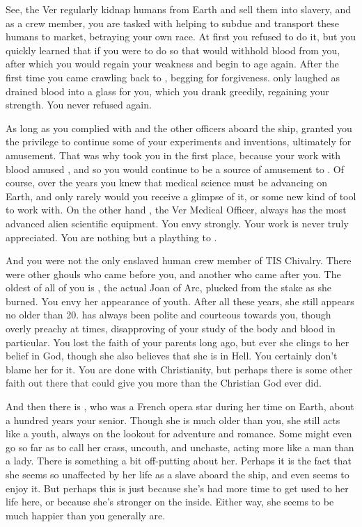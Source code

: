 \documentclass[char]{guildcamp4}
\begin{document}
See, the Ver regularly kidnap humans from Earth and sell them into slavery, and as a crew member, you are tasked with helping to subdue and transport these humans to market, betraying your own race. At first you refused to do it, but you quickly learned that if you were to do so that \cVone{} would withhold \cVone{\their} blood from you, after which you would regain your weakness and begin to age again. After the first time you came crawling back to \cVone{}, begging for forgiveness. \cVone{} only laughed as \cVone{\they} drained \cVone{\their} blood into a glass for you, which you drank greedily, regaining your strength. You never refused again.

As long as you complied with \cVone{} and the other officers aboard the ship, \cVone{} granted you the privilege to continue some of your experiments and inventions, ultimately for \cVone{\their} amusement. That was why \cVone{\they} took you in the first place, because your work with blood amused \cVone{\them}, and so you would continue to be a source of amusement to \cVone{\them}. Of course, over the years you knew that medical science must be advancing on Earth, and only rarely would you receive a glimpse of it, or some new kind of tool to work with. On the other hand \cVthree{}, the Ver Medical Officer, always has the most advanced alien scientific equipment. You envy \cVthree{\them} strongly. Your work is never truly appreciated. You are nothing but a plaything to \cVone{}.

And you were not the only enslaved human crew member of TIS Chivalry. There were other ghouls who came before you, and another who came after you. The oldest of all of you is \cJoan{}, the actual Joan of Arc, plucked from the stake as she burned. You envy her appearance of youth. After all these years, she still appears no older than 20. \cJoan{} has always been polite and courteous towards you, though overly preachy at times, disapproving of your study of the body and blood in particular. You lost the faith of your parents long ago, but ever she clings to her belief in God, though she also believes that she is in Hell. You certainly don't blame her for it. You are done with Christianity, but perhaps there is some other faith out there that could give you more than the Christian God ever did.

And then there is \cJulie{}, who was a French opera star during her time on Earth, about a hundred years your senior. Though she is much older than you, she still acts like a youth, always on the lookout for adventure and romance. Some might even go so far as to call her crass, uncouth, and unchaste, acting more like a man than a lady. There is something a bit off-putting about her. Perhaps it is the fact that she seems so unaffected by her life as a slave aboard the ship, and even seems to enjoy it. But perhaps this is just because she's had more time to get used to her life here, or because she's stronger on the inside. Either way, she seems to be much happier than you generally are.
\end{document}
